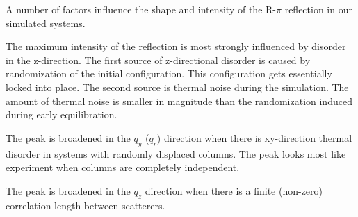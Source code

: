 \documentclass{article}
\begin{document}
  A number of factors influence the shape and intensity of the R-$\pi$ reflection
  in our simulated systems.
 
  The maximum intensity of the reflection is most strongly influenced by
  disorder in the z-direction. The first source of z-directional disorder is
  caused by randomization of the initial configuration.  This configuration gets
  essentially locked into place. The second source is thermal noise during the
  simulation. The amount of thermal noise is smaller in magnitude than the
  randomization induced during early equilibration. 

  The peak is broadened in the $q_y$ ($q_r$) direction when there is
  xy-direction thermal disorder in systems with randomly displaced columns. The
  peak looks most like experiment when columns are completely independent.
 
  The peak is broadened in the $q_z$ direction when there is a finite (non-zero)
  correlation length between scatterers.
 
\end{document}
